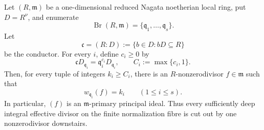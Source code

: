 \begin{proposition}
\label{prop:p126-curve-conductor-principal-realization}
Let \((R,\mathfrak m)\) be a one-dimensional reduced Nagata noetherian
local ring, put \(D=R^\nu\), and enumerate
\[
             \operatorname{Br}(R,\mathfrak m)
                     =\{\mathfrak q_1,\ldots,\mathfrak q_s\}.
\]
Let
\[
 \mathfrak c=(R:D):=\{b\in D:bD\subseteq R\}
\]
be the conductor.  For every \(i\), define \(c_i\geq0\) by
\[
 \mathfrak cD_{\mathfrak q_i}
     =\mathfrak q_i^{c_i}D_{\mathfrak q_i},
 \qquad C_i:=\max\{c_i,1\}.
 \tag{\(\clubsuit\)}\label{eq:p126-curve-conductor-orders}
\]
Then, for every tuple of integers \(k_i\geq C_i\), there is an
\(R\)-nonzerodivisor \(f\in\mathfrak m\) such that
\[
                              w_{\mathfrak q_i}(f)=k_i
                       \qquad(1\leq i\leq s).
 \tag{\(\spadesuit\)}\label{eq:p126-prescribed-branch-orders}
\]
In particular, \((f)\) is an \(\mathfrak m\)-primary principal ideal.
Thus every sufficiently deep integral effective divisor on the finite
normalization fibre is cut out by one nonzerodivisor downstairs.
\end{proposition}

